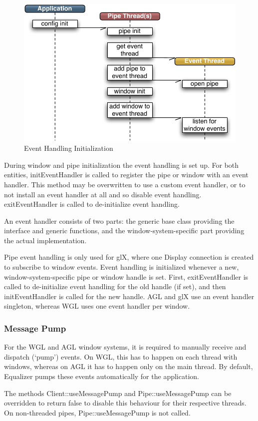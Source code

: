 \documentclass[10pt,a4]{scrartcl}
\begin{document}
\begin{figure}
  \includegraphics[width=.4\textwidth]{images/eventInit.pdf}
  {\caption{\small\label{fEventInit}Event Handling Initialization}}
\end{figure}
During window and pipe initialization the event handling is set up. For
both entities, \textsf{initEvent\-Handler} is called to register the
pipe or window with an event handler. This method may be overwritten to
use a custom event handler, or to not install an event handler at all and so
disable event handling. \textsf{exitEventHandler} is called to
de-initialize event handling.

An event handler consists of two parts: the generic base class providing
the interface and generic functions, and the window-system-specific
part providing the actual implementation. 

Pipe event handling is only used for glX, where one \textsf{Display}
connection is created to subscribe to window events. Event handling is
initialized whenever a new, window-system-specific pipe or window handle
is set. First, \textsf{exitEventHandler} is called to de-initialize
event handling for the old handle (if set), and then
\textsf{initEvent\-Handler} is called for the new handle. AGL and glX use
an event handler singleton, whereas WGL uses one event handler per
window.

\subsubsection{Message Pump}

For the WGL and AGL window systems, it is required to manually receive and
dispatch (`pump') events. On WGL, this has to happen on each thread with
windows, whereas on AGL it has to happen only on the main thread. By
default, Equalizer pumps these events automatically for the application.

The methods \textsf{Client::useMessagePump} and
\textsf{Pipe::useMessagePump} can be overridden to return \textsf{false}
to disable this behaviour for their respective threads. On non-threaded
pipes, \textsf{Pipe::useMessagePump} is not called.
\end{document}
